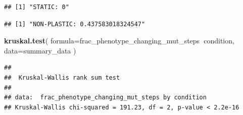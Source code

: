 \documentclass[]{book}
\newenvironment{Shaded}{\begin{snugshade}}{\end{snugshade}}
\newcommand{\DataTypeTok}[1]{\textcolor[rgb]{0.13,0.29,0.53}{#1}}
\newcommand{\KeywordTok}[1]{\textcolor[rgb]{0.13,0.29,0.53}{\textbf{#1}}}
\newcommand{\NormalTok}[1]{#1}
\newcommand{\OperatorTok}[1]{\textcolor[rgb]{0.81,0.36,0.00}{\textbf{#1}}}
\newcommand{\StringTok}[1]{\textcolor[rgb]{0.31,0.60,0.02}{#1}}
\begin{document}
\begin{Shaded}
\end{Shaded}

\begin{verbatim}
## [1] "STATIC: 0"
\end{verbatim}

\begin{Shaded}
\end{Shaded}

\begin{verbatim}
## [1] "NON-PLASTIC: 0.437583018324547"
\end{verbatim}

\begin{Shaded}
\begin{Highlighting}[]
\KeywordTok{kruskal.test}\NormalTok{(}
  \DataTypeTok{formula=}\NormalTok{frac_phenotype_changing_mut_steps}\OperatorTok{~}\NormalTok{condition,}
  \DataTypeTok{data=}\NormalTok{summary_data}
\NormalTok{)}
\end{Highlighting}
\end{Shaded}

\begin{verbatim}
## 
##  Kruskal-Wallis rank sum test
## 
## data:  frac_phenotype_changing_mut_steps by condition
## Kruskal-Wallis chi-squared = 191.23, df = 2, p-value < 2.2e-16
\end{verbatim}

\begin{Shaded}
\end{Shaded}
\end{document}
